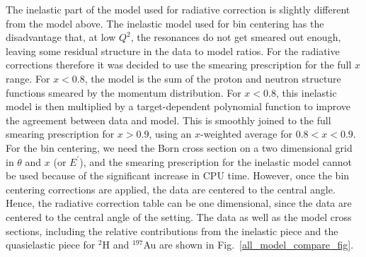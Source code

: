 The inelastic part of the model used for radiative correction is slightly
different from the model above. The inelastic model used for bin centering has
the disadvantage that, at low $Q^2$, the resonances do not get smeared out
enough, leaving some residual structure in the data to model ratios. For the
radiative corrections therefore it was decided to use the smearing
prescription for the full $x$ range. For $x<0.8$, the model is the sum of the
proton and neutron structure functions smeared by the momentum distribution.
For $x<0.8$, this inelastic model is then multiplied by a target-dependent
polynomial function to improve the agreement between data and model. This is
smoothly joined to the full smearing prescription for $x>0.9$, using an
$x$-weighted average for $0.8<x<0.9$. For the bin centering, we need the Born
cross section on a two dimensional grid in $\theta$ and $x$ (or $E^{'}$), and
the smearing prescription for the inelastic model cannot be used because of
the significant increase in CPU time. However, once the bin centering
corrections are applied, the data are centered to the central angle. Hence,
the radiative correction table can be one dimensional, since the data are
centered to the central angle of the setting. The data as well as the model
cross sections, including the relative contributions from the inelastic piece
and the quasielastic piece for $^2$H and $^{197}$Au are shown in
Fig.~\ref{all_model_compare_fig}.


